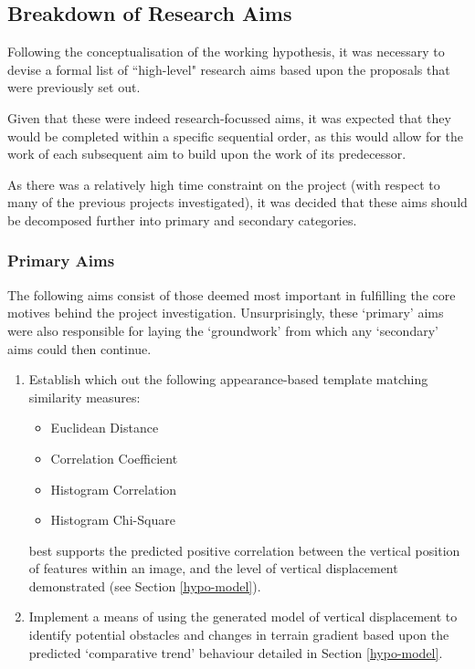 \subsection{Breakdown of Research Aims}
\label{aims}

Following the conceptualisation of the working hypothesis, it was necessary to devise a formal list of ``high-level" research aims based upon the proposals that were previously set out. 

Given that these were indeed research-focussed aims, it was expected that they would be completed within a specific sequential order, as this would allow for the work of each subsequent aim to build upon the work of its predecessor.

As there was a relatively high time constraint on the project (with respect to many of the previous projects investigated), it was decided that these aims should be decomposed further into primary and secondary categories.

\subsubsection{Primary Aims}
\label{primary-aims}

The following aims consist of those deemed most important in fulfilling the core motives behind the project investigation. Unsurprisingly, these `primary' aims were also responsible for laying the `groundwork' from which any `secondary' aims could then continue.  

\begin{enumerate}
	\item Establish which out the following appearance-based template matching similarity measures:
		\begin{itemize}
			\item Euclidean Distance
			\item Correlation Coefficient
			\item Histogram Correlation
			\item Histogram Chi-Square
		\end{itemize}
	 best supports the predicted positive correlation between the vertical position of features within an image, and the level of vertical displacement demonstrated (see Section \ref{hypo-model}).
	 \item Implement a means of using the generated model of vertical displacement to identify potential obstacles and changes in terrain gradient based upon the predicted `comparative trend' behaviour detailed in Section \ref{hypo-model}.
\end{enumerate}


